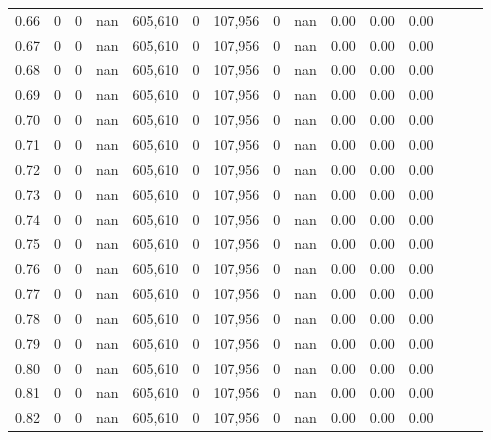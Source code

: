 \begin{tabular}{rrrrrrrrrrrrrrr}
0.66 &       0 &      0 &   nan &  605,610 &        0 &  107,956 &        0 &   nan &  0.00 &  0.00 &      0.00 \\
0.67 &       0 &      0 &   nan &  605,610 &        0 &  107,956 &        0 &   nan &  0.00 &  0.00 &      0.00 \\
0.68 &       0 &      0 &   nan &  605,610 &        0 &  107,956 &        0 &   nan &  0.00 &  0.00 &      0.00 \\
0.69 &       0 &      0 &   nan &  605,610 &        0 &  107,956 &        0 &   nan &  0.00 &  0.00 &      0.00 \\
0.70 &       0 &      0 &   nan &  605,610 &        0 &  107,956 &        0 &   nan &  0.00 &  0.00 &      0.00 \\
0.71 &       0 &      0 &   nan &  605,610 &        0 &  107,956 &        0 &   nan &  0.00 &  0.00 &      0.00 \\
0.72 &       0 &      0 &   nan &  605,610 &        0 &  107,956 &        0 &   nan &  0.00 &  0.00 &      0.00 \\
0.73 &       0 &      0 &   nan &  605,610 &        0 &  107,956 &        0 &   nan &  0.00 &  0.00 &      0.00 \\
0.74 &       0 &      0 &   nan &  605,610 &        0 &  107,956 &        0 &   nan &  0.00 &  0.00 &      0.00 \\
0.75 &       0 &      0 &   nan &  605,610 &        0 &  107,956 &        0 &   nan &  0.00 &  0.00 &      0.00 \\
0.76 &       0 &      0 &   nan &  605,610 &        0 &  107,956 &        0 &   nan &  0.00 &  0.00 &      0.00 \\
0.77 &       0 &      0 &   nan &  605,610 &        0 &  107,956 &        0 &   nan &  0.00 &  0.00 &      0.00 \\
0.78 &       0 &      0 &   nan &  605,610 &        0 &  107,956 &        0 &   nan &  0.00 &  0.00 &      0.00 \\
0.79 &       0 &      0 &   nan &  605,610 &        0 &  107,956 &        0 &   nan &  0.00 &  0.00 &      0.00 \\
0.80 &       0 &      0 &   nan &  605,610 &        0 &  107,956 &        0 &   nan &  0.00 &  0.00 &      0.00 \\
0.81 &       0 &      0 &   nan &  605,610 &        0 &  107,956 &        0 &   nan &  0.00 &  0.00 &      0.00 \\
0.82 &       0 &      0 &   nan &  605,610 &        0 &  107,956 &        0 &   nan &  0.00 &  0.00 &      0.00 \\

\end{tabular}
